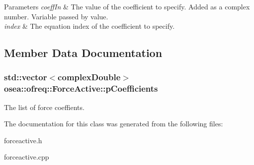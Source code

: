 \begin{DoxyParams}{Parameters}
{\em coeff\-In} & The value of the coefficient to specify. Added as a complex number. Variable passed by value. \\
\hline
{\em index} & The equation index of the coefficient to specify. \\
\hline
\end{DoxyParams}


\subsection{Member Data Documentation}
\hypertarget{classosea_1_1ofreq_1_1_force_active_af5731f3a699256f0b0b61b77701b236a}{
\subsubsection[{p\-Coefficients}]{\setlength{\rightskip}{0pt plus 5cm}std\-::vector$<${\bf complex\-Double}$>$ osea\-::ofreq\-::\-Force\-Active\-::p\-Coefficients\hspace{0.3cm}{\ttfamily [protected]}}}\label{classosea_1_1ofreq_1_1_force_active_af5731f3a699256f0b0b61b77701b236a}
The list of force coeffients. 

The documentation for this class was generated from the following files\-:\begin{DoxyCompactItemize}
\item 
forceactive.\-h\item 
forceactive.\-cpp\end{DoxyCompactItemize}
